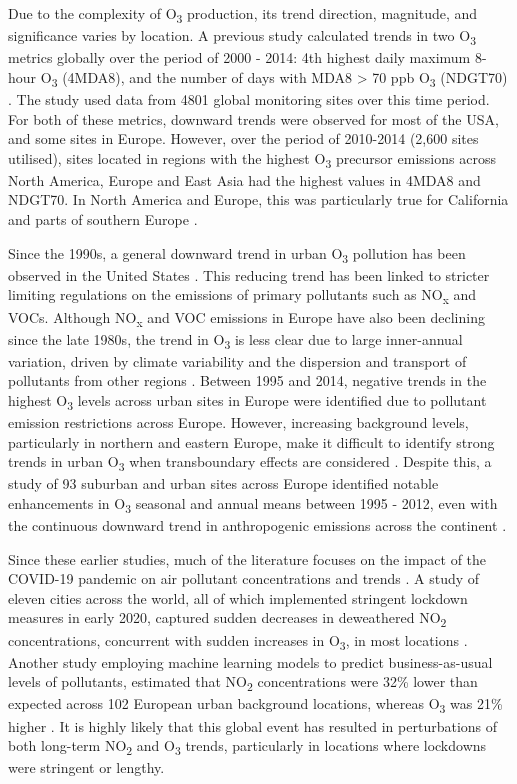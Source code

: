 \documentclass[journal abbreviation, manuscript]{copernicus}
\begin{document}
Due to the complexity of O\textsubscript{3} production, its trend direction, magnitude, and significance varies by location. A previous study calculated trends in two O\textsubscript{3} metrics globally over the period of 2000 - 2014: 4th highest daily maximum 8-hour O\textsubscript{3} (4MDA8), and the number of days with MDA8 > 70 ppb O\textsubscript{3} (NDGT70) \citep{fleming_2018}. The study used data from 4801 global monitoring sites over this time period. For both of these metrics, downward trends were observed for most of the USA, and some sites in Europe. However, over the period of 2010-2014 (2,600 sites utilised), sites located in regions with the highest O\textsubscript{3} precursor emissions across North America, Europe and East Asia had the highest values in 4MDA8 and NDGT70. In North America and Europe, this was particularly true for California and parts of southern Europe \citep{fleming_2018}.

Since the 1990s, a general downward trend in urban O\textsubscript{3} pollution has been observed in the United States \citep{acp-20-3191-2020}. This reducing trend has been linked to stricter limiting regulations on the emissions of primary pollutants such as NO\textsubscript{x} and VOCs. Although NO\textsubscript{x} and VOC emissions in Europe have also been declining since the late 1980s, the trend in O\textsubscript{3} is less clear due to large inner-annual variation, driven by climate variability and the dispersion and transport of pollutants from other regions \citep{acp-6-51-2006, acp-18-5589-2018}. Between 1995 and 2014, negative trends in the highest O\textsubscript{3} levels across urban sites in Europe were identified due to pollutant emission restrictions across Europe. However, increasing background levels, particularly in northern and eastern Europe, make it difficult to identify strong trends in urban O\textsubscript{3} when transboundary effects are considered \citep{acp-18-5589-2018}. Despite this, a study of 93 suburban and urban sites across Europe identified notable enhancements in O\textsubscript{3} seasonal and annual means between 1995 - 2012, even with the continuous downward trend in anthropogenic emissions across the continent \citep{acp-18-5589-2018}.

Since these earlier studies, much of the literature focuses on the impact of the COVID-19 pandemic on air pollutant concentrations and trends \citep{acp-20-15743-2020, doi:10.1126/sciadv.abd6696, acp-21-4169-2021, SOKHI2021106818}. A study of eleven cities across the world, all of which implemented stringent lockdown measures in early 2020, captured sudden decreases in deweathered NO\textsubscript{2} concentrations, concurrent with sudden increases in O\textsubscript{3}, in most locations \citep{doi:10.1126/sciadv.abd6696}. Another study employing machine learning models to predict business-as-usual levels of pollutants, estimated that NO\textsubscript{2} concentrations were 32\% lower than expected across 102 European urban background locations, whereas O\textsubscript{3} was 21\% higher \citep{acp-21-4169-2021}. It is highly likely that this global event has resulted in perturbations of both long-term NO\textsubscript{2} and O\textsubscript{3} trends, particularly in locations where lockdowns were stringent or lengthy.
\end{document}

